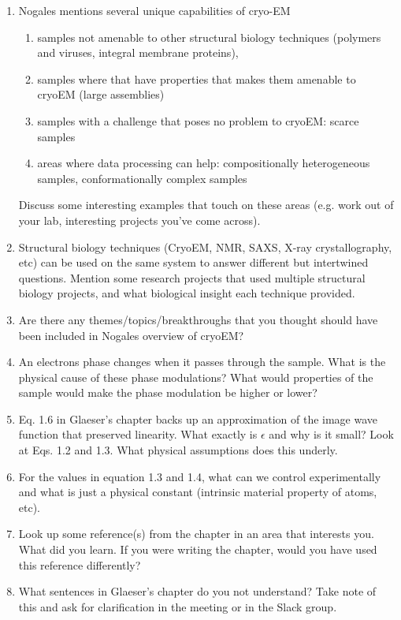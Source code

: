 \documentclass[11pt, oneside]{article}   	%
\begin{document}
\begin{enumerate}
	\item Nogales mentions several unique capabilities of cryo-EM 
	\begin{enumerate}
		\item samples not amenable to other structural biology techniques (polymers and viruses, integral membrane proteins),
		\item samples where that have properties that makes them amenable to cryoEM (large assemblies)
		\item samples with a challenge that poses no problem to cryoEM: scarce samples
		\item areas where data processing can help: compositionally heterogeneous samples, conformationally complex samples
	\end{enumerate}
	 Discuss some interesting examples that touch on these areas (e.g. work out of your lab, interesting projects you've come across).
	\item Structural biology techniques (CryoEM, NMR, SAXS, X-ray crystallography, etc) can be used on the same system to answer different but intertwined questions. Mention some research projects that used multiple structural biology projects, and what biological insight each technique provided.
	\item Are there any themes/topics/breakthroughs that you thought should have been included in Nogales overview of cryoEM? 
	\item An electrons phase changes when it passes through the sample. What is the physical cause of these phase modulations? What would properties of the sample would make the phase modulation be higher or lower?
	\item Eq. 1.6 in Glaeser's chapter backs up an approximation of the image wave function that preserved linearity. What exactly is $\epsilon$ and why is it small? Look at Eqs. 1.2 and 1.3. What physical assumptions does this underly. 
	\item For the values in equation 1.3 and 1.4, what can we control experimentally and what is just a physical constant (intrinsic material property of atoms, etc).
	\item Look up some reference(s) from the chapter in an area that interests you. What did you learn. If you were writing the chapter, would you have used this reference differently?
	\item What sentences in Glaeser's chapter do you not understand? Take note of this and ask for clarification in the meeting or in the Slack group.
\end{enumerate}
\end{document}
